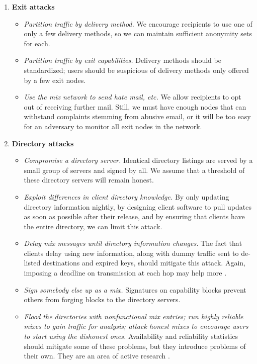 \documentclass[11pt]{IEEEtran}
\begin{document}
\begin{enumerate}
\item \textbf{Exit attacks}

\begin{itemize}
\item \emph{Partition traffic by delivery method.} We encourage recipients
to use one of only a few delivery methods, so we can maintain sufficient
anonymity sets for each.
\item \emph{Partition traffic by exit capabilities.}
Delivery methods should be standardized; users should be suspicious of
delivery methods only offered by a few exit nodes.
\item \emph{Use the mix network to send hate mail, etc.} We allow
recipients to opt out of receiving further mail.  Still, we must have
enough nodes that can withstand complaints stemming from abusive
email, or it will be too easy for an adversary to monitor all exit nodes in
the network.
\end{itemize}

\item \textbf{Directory attacks}

\begin{itemize}
\item \emph{Compromise a directory server.} Identical directory listings
are served by a small group of servers and signed by all. We assume
that a threshold of these directory servers will remain honest.
\item \emph{Exploit differences in client directory knowledge.} By only
updating directory information nightly, by designing client software to
pull updates as soon as possible after their release, and by ensuring
that clients have the entire directory, we can limit this attack.
\item \emph{Delay mix messages until directory information changes.}
The fact that clients delay using new information, along with dummy
traffic sent to de-listed destinations and expired keys, should mitigate
this attack. Again, imposing a deadline on transmission at each hop
may help more \cite{mix-acc}.
\item \emph{Sign somebody else up as a mix.}  Signatures on capability
blocks prevent others from forging blocks to the directory servers.
\item \emph{Flood the directories with nonfunctional mix entries; run
highly reliable mixes to gain traffic for analysis; attack honest mixes
to encourage users to start using the dishonest ones.}
Availability and reliability statistics should mitigate some of these
problems, but they introduce problems of their own. They are an area of
active research \cite{mix-acc}\cite{casc-rep}.
\end{itemize}
\end{enumerate}
\end{document}
